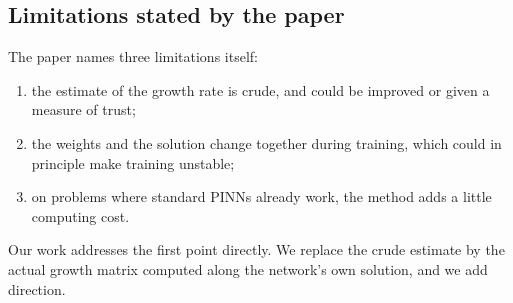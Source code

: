\documentclass[11pt,a4paper]{article}
\begin{document}
\subsection{Limitations stated by the paper}
The paper names three limitations itself:
\begin{enumerate}
\item the estimate of the growth rate is crude, and could be improved or given a measure of
  trust;
\item the weights and the solution change together during training, which could in
  principle make training unstable;
\item on problems where standard PINNs already work, the method adds a little computing
  cost.
\end{enumerate}
Our work addresses the first point directly. We replace the crude estimate by the actual
growth matrix computed along the network's own solution, and we add direction.
\end{document}
